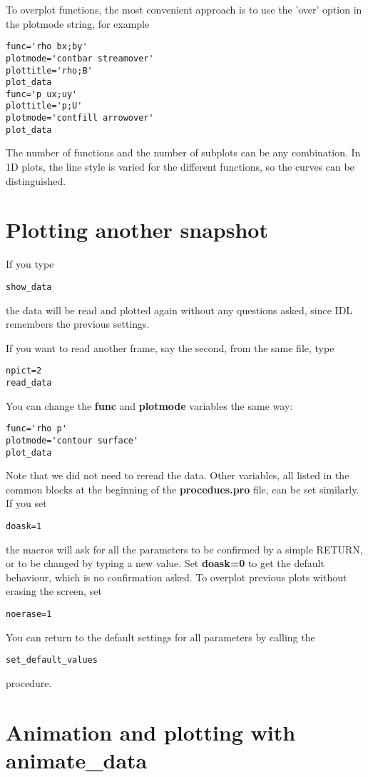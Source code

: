 \documentclass{article}
\begin{document}
To overplot functions, the most convenient approach
is to use the 'over' option in the plotmode string, for example
\begin{verbatim}
func='rho bx;by'
plotmode='contbar streamover'
plottitle='rho;B'
plot_data
func='p ux;uy'
plottitle='p;U'
plotmode='contfill arrowover'
plot_data
\end{verbatim}
The number of functions and the number of subplots can be any combination.
In 1D plots, the line style is varied for the different 
functions, so the curves can be distinguished.

\section{Plotting another snapshot \label{s-plot-another}}

If you type
\begin{verbatim}
show_data
\end{verbatim}
the data will be read and plotted again without any questions asked,
since IDL remembers the previous settings. 

If you want to read another frame, say the second, from the same file, type
\begin{verbatim}
npict=2
read_data
\end{verbatim}
You can change the {\bf func} and {\bf plotmode} variables the same way:
\begin{verbatim}
func='rho p'
plotmode='contour surface'
plot_data
\end{verbatim}
Note that we did not need to reread the data.
Other variables, all listed in the common blocks at the beginning of the
{\bf procedues.pro} file, can be set similarly.
If you set
\begin{verbatim}
doask=1
\end{verbatim}
the macros will ask for all the parameters to be confirmed by a simple
RETURN, or to be changed by typing a new value. Set {\bf doask=0} to
get the default behaviour, which is no confirmation asked.
To overplot previous plots without erasing the screen, set
\begin{verbatim}
noerase=1
\end{verbatim}
You can return to the default settings for all parameters by calling the
\begin{verbatim}
set_default_values
\end{verbatim}
procedure.

\section{Animation and plotting with animate\_data \label{s-animate}}
\end{document}

